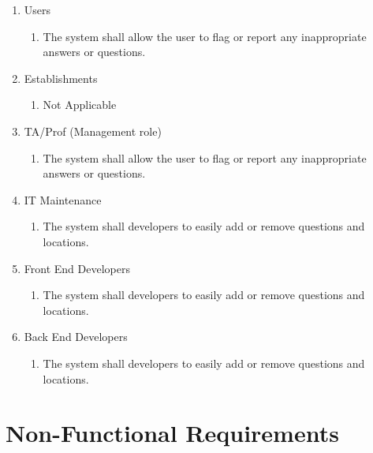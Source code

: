 \documentclass[titlepage]{article}
\begin{document}
\begin{enumerate}[{BE1}]
\begin{enumerate}[{VP5.1}]
				\item Users
				\begin{enumerate}
					\item The system shall allow the user to flag or report any inappropriate answers or questions.
				\end{enumerate}
				
				\item Establishments
				\begin{enumerate}
					\item Not Applicable
				\end{enumerate}
				
				\item TA/Prof (Management role)
				\begin{enumerate}
					\item The system shall allow the user to flag or report any inappropriate answers or questions.
				\end{enumerate}
				
				\item IT Maintenance
				\begin{enumerate}
					\item The system shall developers to easily add or remove questions and locations.
				\end{enumerate}
				
				\item Front End Developers
				\begin{enumerate}
					\item The system shall developers to easily add or remove questions and locations.
				\end{enumerate}
				
				\item Back End Developers
				\begin{enumerate}
					\item The system shall developers to easily add or remove questions and locations.
				\end{enumerate}
			\end{enumerate}
			
		\end{enumerate}
		
		\section{Non-Functional Requirements}
		\label{sec:non-functional_requirements}
		
\end{document}
